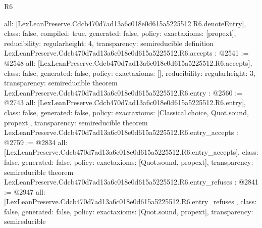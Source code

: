 \begin{lexlean}{R6}
\begin{coremodule}
{  all: [LexLeanPreserve.Cdcb470d7ad13a6c018e0d615a5225512.R6.denoteEntry],
  class: false,
  compiled: true,
  generated: false,
  policy: exact{axioms: [propext]},
  reducibility: regular{height: 4},
  transparency: semireducible
}
definition LexLeanPreserve.Cdcb470d7ad13a6c018e0d615a5225512.R6.accepts : @2541 := @2548 {
  all: [LexLeanPreserve.Cdcb470d7ad13a6c018e0d615a5225512.R6.accepts],
  class: false,
  generated: false,
  policy: exact{axioms: []},
  reducibility: regular{height: 3},
  transparency: semireducible
}
theorem LexLeanPreserve.Cdcb470d7ad13a6c018e0d615a5225512.R6.entry : @2560 := @2743 {
  all: [LexLeanPreserve.Cdcb470d7ad13a6c018e0d615a5225512.R6.entry],
  class: false,
  generated: false,
  policy: exact{axioms: [Classical.choice, Quot.sound, propext]},
  transparency: semireducible
}
theorem LexLeanPreserve.Cdcb470d7ad13a6c018e0d615a5225512.R6.entry_accepts : @2759 := @2834 {
  all: [LexLeanPreserve.Cdcb470d7ad13a6c018e0d615a5225512.R6.entry_accepts],
  class: false,
  generated: false,
  policy: exact{axioms: [Quot.sound, propext]},
  transparency: semireducible
}
theorem LexLeanPreserve.Cdcb470d7ad13a6c018e0d615a5225512.R6.entry_refuses : @2841 := @2947 {
  all: [LexLeanPreserve.Cdcb470d7ad13a6c018e0d615a5225512.R6.entry_refuses],
  class: false,
  generated: false,
  policy: exact{axioms: [Quot.sound, propext]},
  transparency: semireducible
}


\end{coremodule}
\end{lexlean}
